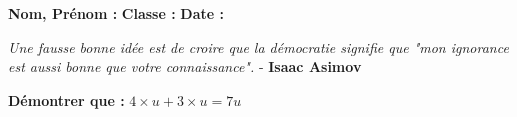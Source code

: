 



\textbf{Nom, Prénom :} \hspace{8cm} \textbf{Classe :} \hspace{3cm} \textbf{Date :}\\

\vspace{-0.8cm}

\begin{center}
  \textit{Une fausse bonne idée est de croire que la démocratie signifie que "mon ignorance est aussi bonne que votre connaissance".} - \textbf{Isaac Asimov}
\end{center}

\textbf{Démontrer que :} $4 \times u + 3 \times u = 7u$ \\ \Pointilles[4] 

\vspace{-0.6cm}

